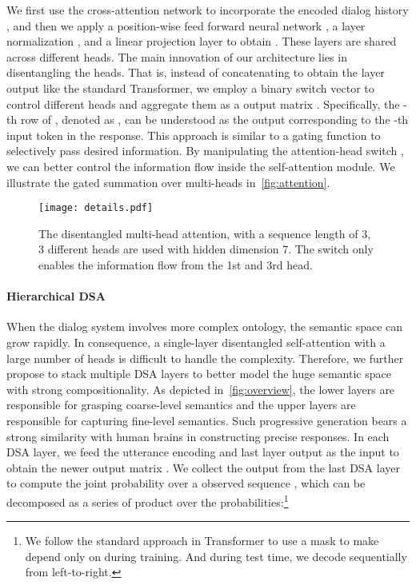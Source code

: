 \documentclass[11pt,a4paper]{article}
\begin{document}
We first use the cross-attention network  to incorporate the encoded dialog history , and then we apply a position-wise feed forward neural network , a layer normalization , and a linear projection layer  to obtain . These layers are shared across different heads. The main innovation of our architecture lies in disentangling the heads. That is, instead of concatenating  to obtain the layer output like the standard Transformer, we employ a binary switch vector  to control  different heads and aggregate them as a  output matrix . Specifically, the -th row of , denoted as , can be understood as the output corresponding to the -th input token  in the response. This approach is similar to a gating function to selectively pass desired information. By manipulating the attention-head switch , we can better control the information flow inside the self-attention module. We illustrate the gated summation over multi-heads in~\autoref{fig:attention}.

\begin{figure}[thb]
    \begin{center}
    \texttt{[image: details.pdf]}
    \end{center}
    \vspace{-4ex}
    \caption{The disentangled multi-head attention, with a sequence length of 3, 3 different heads are used with hidden dimension 7. The switch only enables the information flow from the 1st and 3rd head.}
    \label{fig:attention}
\end{figure}


\paragraph{Hierarchical DSA}
When the dialog system involves more complex ontology, the semantic space can grow rapidly. In consequence, a single-layer disentangled self-attention with a large number of heads is difficult to handle the complexity. Therefore, we further propose to stack multiple DSA layers to better model the huge semantic space with strong compositionality. As depicted in~\autoref{fig:overview}, the lower layers are responsible for grasping coarse-level semantics and the upper layers are responsible for capturing fine-level semantics. Such progressive generation bears a strong similarity with human brains in constructing precise responses. In each DSA layer, we feed the utterance encoding  and last layer output  as the input to obtain the newer output matrix . We collect the output  from the last DSA layer to compute the joint probability over a observed sequence , which can be decomposed as a series of product over the probabilities:\footnote{We follow the standard approach in Transformer to use a mask to make  depend only on  during training. And during test time, we decode sequentially from left-to-right.}
\end{document}
